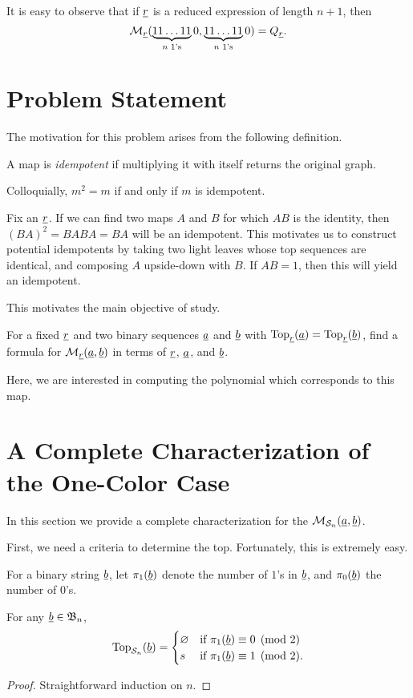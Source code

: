 It is easy to observe that if $\underline{r}$ is a reduced expression of length $n+1$, then \[ \mathcal M_{\underline{r}} ( \underbrace{11\dots11}_{\text{$n$ 1's}}0, \underbrace{11\dots11}_{\text{$n$ 1's}}0 ) = Q_{\underline{r}}. \]


\section{Problem Statement}
\label{sec:probstate}

The motivation for this problem arises from the following definition.
\begin{definition*}
	A map is \emph{idempotent} if multiplying it with itself returns the original graph.
\end{definition*}
Colloquially, $m^2=m$ if and only if $m$ is idempotent.

Fix an $\underline{r}$.  If we can find two maps $A$ and $B$ for which $AB$ is the identity, then $(BA)^2=BABA=BA$ will be an idempotent.  This motivates us to construct potential idempotents by taking two light leaves whose top sequences are identical, and composing $A$ upside-down with $B$.  If $AB=1$, then this will yield an idempotent.

This motivates the main objective of study.
\begin{ques*}
	For a fixed $\underline{r}$ and two binary sequences $\underline{a}$ and $\underline{b}$ with $\operatorname{Top}_{\underline{r}}(\underline{a}) = \operatorname{Top}_{\underline{r}}(\underline{b})$, find a formula for $\mathcal M_{\underline{r}}(\underline{a}, \underline{b})$ in terms of $\underline{r}$, $\underline{a}$, and $\underline{b}$.
\end{ques*}
Here, we are interested in computing the polynomial which corresponds to this map.

\section{A Complete Characterization of the One-Color Case}
\label{sec:res_onecolor}
In this section we provide a complete characterization for the $\mathcal M_{\mathcal S_n}(\underline{a}, \underline{b})$.  %

First, we need a criteria to determine the top.  Fortunately, this is extremely easy.
\begin{definition*}
	For a binary string $\underline{b}$, let $\pi_1(\underline{b})$ denote the number of $1$'s in $\underline{b}$, and $\pi_0(\underline{b})$ the number of $0$'s.
\end{definition*}
\begin{proposition}
	For any $\underline{b} \in \mathfrak B_n$, \[
		\operatorname{Top}_{\mathcal S_n}(\underline{b}) =
		\begin{cases}
			\varnothing & \text{if } \pi_1(\underline{b}) \equiv 0 \pmod{2} \\
			s & \text{if } \pi_1(\underline{b}) \equiv 1 \pmod{2}.
		\end{cases}
		\]
	\label{prop:s_top}
\end{proposition}
\begin{proof}
	Straightforward induction on $n$.  
\end{proof}

